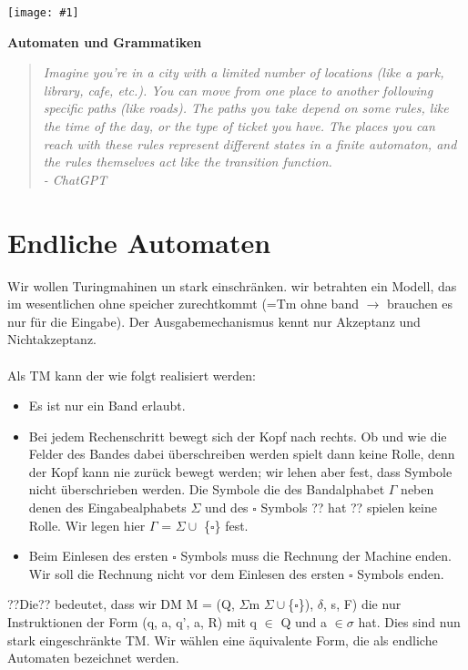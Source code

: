 \documentclass[a4paper,11pt]{article}
\newcommand{\coversection}[3]{
  \newpage
  \thispagestyle{empty}
  \begin{center}
    \vspace*{\fill}
    \texttt{[image: \#1]}
    \vspace*{0.5cm} %
    \par
    \Large\textbf{#2}
    \par\vspace{0.5cm} %
    \begin{quote}
      \itshape\small\raggedleft #3
    \end{quote}
    \par\vspace{\fill}
  \end{center}
  \newpage
}
\begin{document}
\coversection{finit1.png}{Automaten und Grammatiken}{Imagine you're in a city with a limited number of locations (like a park, library, cafe, etc.). You can move from one place to another following specific paths (like roads). The paths you take depend on some rules, like the time of the day, or the type of ticket you have. The places you can reach with these rules represent different states in a finite automaton, and the rules themselves act like the transition function.\\ \hspace*{\fill} - ChatGPT}
\section{Endliche Automaten}
Wir wollen Turingmahinen un stark einschränken. 
wir betrahten ein Modell, das im wesentlichen ohne speicher
zurechtkommt (=Tm ohne band $\longrightarrow$  brauchen es nur für die Eingabe).
Der Ausgabemechanismus kennt nur Akzeptanz und Nichtakzeptanz.\\\\
Als TM kann der wie folgt realisiert werden:
\begin{itemize}
    \item Es ist nur ein Band erlaubt.
    \item Bei jedem Rechenschritt bewegt sich der Kopf nach rechts. Ob und wie die Felder des Bandes dabei überschreiben werden spielt dann keine Rolle, denn der Kopf kann nie zurück bewegt werden; wir lehen aber fest, dass Symbole nicht überschrieben werden. Die Symbole die des Bandalphabet $\Gamma $ neben denen des Eingabealphabets $\Sigma $ und des $\square $  Symbols ?? hat ?? spielen keine Rolle. Wir legen hier $\varGamma $ = $\Sigma \cup $ \{$\square $\} fest.
    \item Beim Einlesen des ersten $\square $ Symbols muss die Rechnung der Machine enden. Wir soll die Rechnung nicht vor dem Einlesen des ersten $\square $ Symbols enden. 
\end{itemize}
??Die?? bedeutet, dass wir DM M = (Q, $\Sigma$m $\Sigma\cup $\{$\square $\}), $\delta$, s, F) die nur Instruktionen der Form (q, a, q', a, R) mit q $\in$ Q und a $\in \sigma$ hat.
Dies sind nun stark eingeschränkte TM. Wir wählen eine äquivalente Form, die als endliche Automaten bezeichnet werden. 
\end{document}
